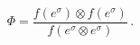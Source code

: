 \begin{equation}
\Phi=\frac{f(e^\sigma)\otimes f(e^\sigma)}{f(e^\sigma
\otimes e^\sigma)}\,.
\end{equation}

